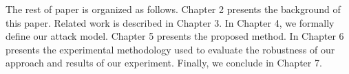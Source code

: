 \documentclass[master,english,final]{kaist-ucs}
\begin{document}
The rest of paper is organized as follows.
Chapter 2 presents the background of this paper.
Related work is described in Chapter 3.
In Chapter 4, we formally define our attack model.
Chapter 5 presents the proposed method.
In Chapter 6 presents the experimental methodology used to evaluate the robustness of our approach and results of our experiment.
Finally, we conclude in Chapter 7.



\end{document}
